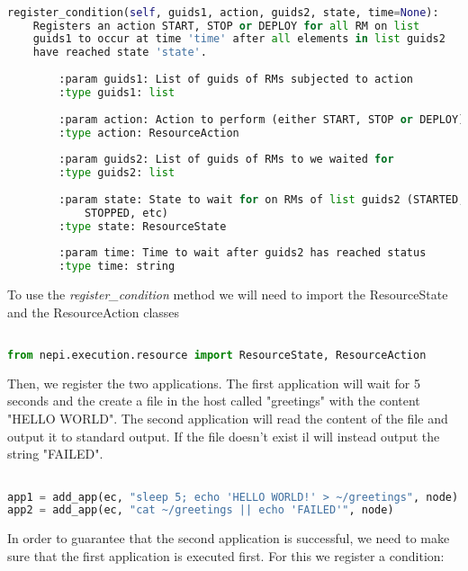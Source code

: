 \begin{lstlisting}[language=Python]

register_condition(self, guids1, action, guids2, state, time=None):
    Registers an action START, STOP or DEPLOY for all RM on list
    guids1 to occur at time 'time' after all elements in list guids2 
    have reached state 'state'.
    
        :param guids1: List of guids of RMs subjected to action
        :type guids1: list
    
        :param action: Action to perform (either START, STOP or DEPLOY)
        :type action: ResourceAction
    
        :param guids2: List of guids of RMs to we waited for
        :type guids2: list
    
        :param state: State to wait for on RMs of list guids2 (STARTED,
            STOPPED, etc)
        :type state: ResourceState
    
        :param time: Time to wait after guids2 has reached status 
        :type time: string

\end{lstlisting}

To use the \textit{register\_condition} method we will need to import the 
ResourceState and the ResourceAction classes

\begin{lstlisting}[language=Python]

from nepi.execution.resource import ResourceState, ResourceAction

\end{lstlisting}

Then, we register the two applications. The first application will 
wait for 5 seconds and the create a file in the host called "greetings" 
with the content "HELLO WORLD". 
The second application will read the content of the file and output it 
to standard output. If the file doesn't exist il will instead output the 
string "FAILED".

\begin{lstlisting}[language=Python]

app1 = add_app(ec, "sleep 5; echo 'HELLO WORLD!' > ~/greetings", node)
app2 = add_app(ec, "cat ~/greetings || echo 'FAILED'", node)

\end{lstlisting}

In order to guarantee that the second application is successful, we need to 
make sure that the first application is executed first. For this we register 
a condition:

